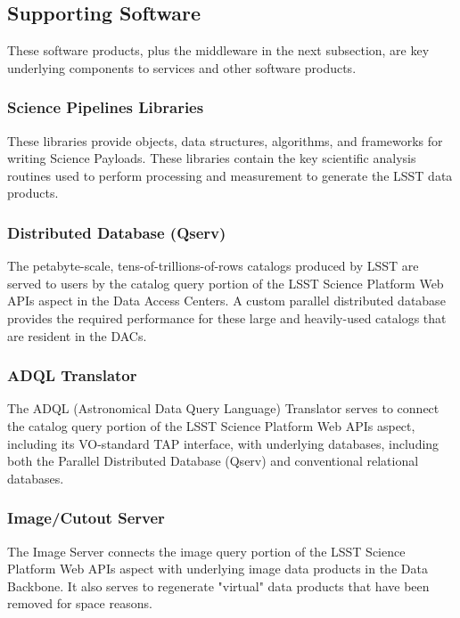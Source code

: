 \documentclass[DM,toc]{lsstdoc}
\begin{document}
\subsection{Supporting Software}\label{supporting-software}

These software products, plus the middleware in the next subsection, are key underlying components to services and other software products.

\subsubsection{Science Pipelines Libraries}\label{science-pipelines-libraries}

These libraries provide objects, data structures, algorithms, and frameworks for writing Science Payloads.
These libraries contain the key scientific analysis routines used to perform processing and measurement to generate the LSST data products.

\subsubsection{Distributed Database
(Qserv)}\label{distributed-database-qserv}

The petabyte-scale, tens-of-trillions-of-rows catalogs produced by LSST are served to users by the catalog query portion of the LSST Science Platform Web APIs aspect in the Data Access Centers.
A custom parallel distributed database provides the required performance for these large and heavily-used catalogs that are resident in the DACs.

\subsubsection{ADQL Translator}\label{adql-translator}

The ADQL (Astronomical Data Query Language) Translator serves to connect the catalog query portion of the LSST Science Platform Web APIs aspect, including its VO-standard TAP interface, with underlying databases, including both the Parallel Distributed Database (Qserv) and conventional relational databases.

\subsubsection{Image/Cutout Server}\label{image-server}

The Image Server connects the image query portion of the LSST Science Platform Web APIs aspect with underlying image data products in the Data Backbone.
It also serves to regenerate "virtual" data products that have been removed for space reasons.
\end{document}
